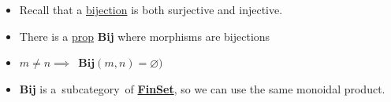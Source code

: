 \begin{itemize}
    \item Recall that a \href{doc/1 math/Seven Sketches in Compositionality/Chapter 1: Generative Effects/2 What is order/Function}{bijection} is both surjective and injective.
    \item There is a \href{doc/1 math/Seven Sketches in Compositionality/Chapter 5: Signal flow graphs/2 Props and presentations/1 Props - definition and first examples/1 Prop}{prop} \textbf{Bij} where morphisms are bijections
    \item $m\ne n \implies$ \,$\mathbf{Bij}(m,n)=\varnothing)$\,
    \item \textbf{Bij} is a \,subcategory\, of \href{doc/1 math/Seven Sketches in Compositionality/Chapter 5: Signal flow graphs/2 Props and presentations/1 Props - definition and first examples/3 FinSet as prop}{\textbf{FinSet}}, so we can use the same monoidal product.
  \end{itemize}